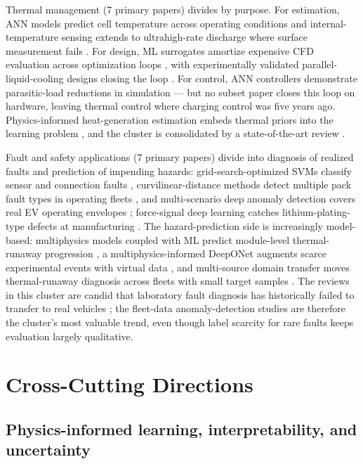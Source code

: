\documentclass[journal]{IEEEtran}
\begin{document}
Thermal management (7 primary papers) divides by purpose. For estimation, ANN models predict cell temperature across operating conditions \cite{r72} and internal-temperature sensing extends to ultrahigh-rate discharge where surface measurement fails \cite{r83}. For design, ML surrogates amortize expensive CFD evaluation across optimization loops \cite{r84}\cite{r73}, with experimentally validated parallel-liquid-cooling designs closing the loop \cite{r85}. For control, ANN controllers demonstrate parasitic-load reductions in simulation \cite{r86} --- but no subset paper closes this loop on hardware, leaving thermal control where charging control was five years ago. Physics-informed heat-generation estimation embeds thermal priors into the learning problem \cite{r9}, and the cluster is consolidated by a state-of-the-art review \cite{r25}.

Fault and safety applications (7 primary papers) divide into diagnosis of realized faults and prediction of impending hazards: grid-search-optimized SVMs classify sensor and connection faults \cite{r74}, curvilinear-distance methods detect multiple pack fault types in operating fleets \cite{r87}, and multi-scenario deep anomaly detection covers real EV operating envelopes \cite{r88}; force-signal deep learning catches lithium-plating-type defects at manufacturing \cite{r89}. The hazard-prediction side is increasingly model-based: multiphysics models coupled with ML predict module-level thermal-runaway progression \cite{r75}, a multiphysics-informed DeepONet augments scarce experimental events with virtual data \cite{r90}, and multi-source domain transfer moves thermal-runaway diagnosis across fleets with small target samples \cite{r76}. The reviews in this cluster are candid that laboratory fault diagnosis has historically failed to transfer to real vehicles \cite{r24}\cite{r23}; the fleet-data anomaly-detection studies are therefore the cluster's most valuable trend, even though label scarcity for rare faults keeps evaluation largely qualitative.

\section{Cross-Cutting Directions}

\subsection{Physics-informed learning, interpretability, and uncertainty}
\end{document}
